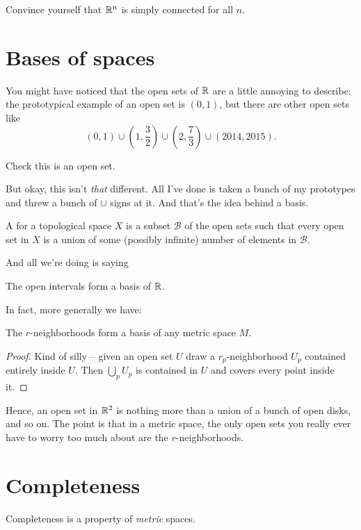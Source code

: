 \begin{ques}
	Convince yourself that $\mathbb R^n$ is simply connected for all $n$.
\end{ques}

\section{Bases of spaces}

You might have noticed that the open sets of $\RR$ are a little annoying to describe:
the prototypical example of an open set is $(0,1)$,
but there are other open sets like
\[
	(0,1)
	\cup \left( 1, \frac32 \right)
	\cup \left( 2, \frac 73 \right)
	\cup (2014, 2015). \]
\begin{ques}
	Check this is an open set.
\end{ques}

But okay, this isn't \emph{that} different.
All I've done is taken a bunch of my prototypes and threw a bunch of $\cup$ signs at it.
And that's the idea behind a basis.

\begin{definition}
	A  for a topological space $X$
	is a subset $\mathcal B$ of the open sets
	such that every open set in $X$
	is a union of some (possibly infinite) number of elements in
	$\mathcal B$.
\end{definition}

And all we're doing is saying
\begin{example}[Basis of $\RR$]
	The open intervals form a basis of $\RR$.
\end{example}
In fact, more generally we have:
\begin{theorem}
	The $r$-neighborhoods form a basis of any metric space $M$.
\end{theorem}
\begin{proof}
	Kind of silly -- given an open set $U$
	draw a $r_p$-neighborhood $U_p$ contained entirely inside $U$.
	Then $\bigcup_p U_p$ is contained in $U$ and covers
	every point inside it.
\end{proof}

Hence, an open set in $\mathbb R^2$ is nothing more than a union
of a bunch of open disks, and so on.
The point is that in a metric space, the only open sets you really
ever have to worry too much about are the $r$-neighborhoods.


\section{Completeness}
Completeness is a property of \emph{metric} spaces.

